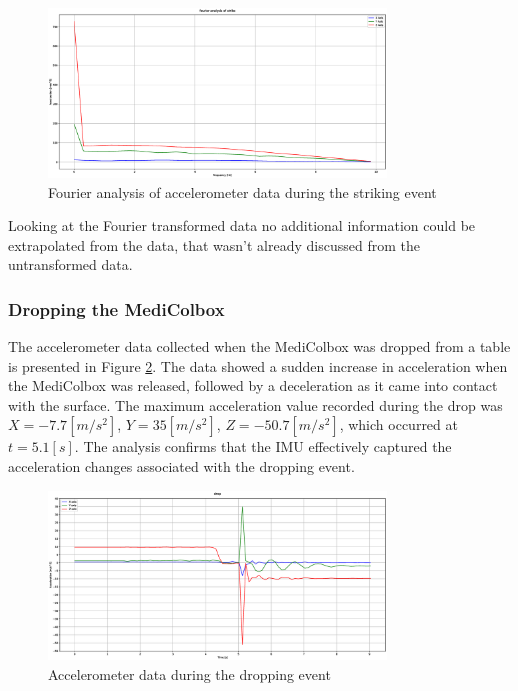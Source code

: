 \documentclass[../main.tex]{subfiles}
\begin{document}
\begin{figure}[htbp]
    \centering
    \includegraphics[width=0.8\textwidth]{resources/figures/Fourier_acceleration_strike.eps}
    \caption{Fourier analysis of accelerometer data during the striking event}
    \label{fig:fourier_accelerometer_striking}
\end{figure}

Looking at the Fourier transformed data no additional information could be extrapolated from the data, that wasn't already discussed from the untransformed data.

\clearpage
\subsubsection{Dropping the MediColbox}

The accelerometer data collected when the MediColbox was
dropped from a table is presented in
Figure \ref{fig:accelerometer_dropping}.
The data showed a sudden increase in acceleration when the
MediColbox was released,
followed by a deceleration as it came into contact with the
surface. The maximum acceleration value recorded during the
drop was
$X = -7.7 [m/s^2]$, $Y = 35 [m/s^2]$, $Z = -50.7 [m/s^2]$,
which occurred at $t = 5.1[s]$.
The analysis confirms that the IMU effectively captured the
acceleration changes associated with the dropping event.

\begin{figure}[htbp]
    \centering
    \includegraphics[width=0.8\textwidth]{resources/figures/Acceleration_drop.eps}
    \caption{Accelerometer data during the dropping event}
    \label{fig:accelerometer_dropping}
\end{figure}
\end{document}
